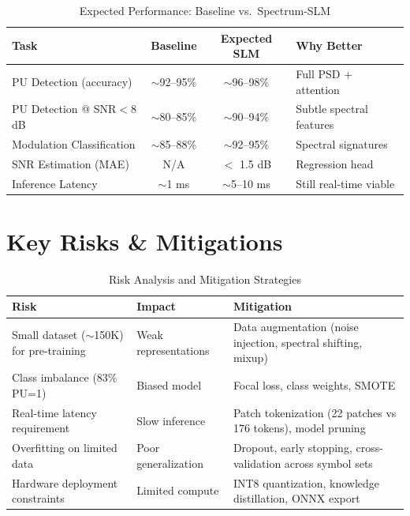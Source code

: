 \documentclass[12pt, a4paper]{article}
\begin{document}
\begin{table}[H]
\centering
\caption{Expected Performance: Baseline vs.\ Spectrum-SLM}
\label{tab:metrics}
\begin{tabular}{@{}lccl@{}}
\toprule
\textbf{Task}                    & \textbf{Baseline}       & \textbf{Expected SLM}    & \textbf{Why Better} \\
\midrule
PU Detection (accuracy)          & $\sim$92--95\%          & $\sim$96--98\%           & Full PSD + attention \\
PU Detection @ SNR$<$8 dB        & $\sim$80--85\%          & $\sim$90--94\%           & Subtle spectral features \\
Modulation Classification        & $\sim$85--88\%          & $\sim$92--95\%           & Spectral signatures \\
SNR Estimation (MAE)             & N/A                     & $<$ 1.5 dB              & Regression head \\
Inference Latency                & $\sim$1 ms              & $\sim$5--10 ms           & Still real-time viable \\
\bottomrule
\end{tabular}
\end{table}


\section{Key Risks \& Mitigations}

\begin{table}[H]
\centering
\caption{Risk Analysis and Mitigation Strategies}
\label{tab:risks}
\begin{tabular}{@{}p{3.5cm}p{2.5cm}p{7cm}@{}}
\toprule
\textbf{Risk}                              & \textbf{Impact} & \textbf{Mitigation} \\
\midrule
Small dataset ($\sim$150K) for pre-training & Weak representations & Data augmentation (noise injection, spectral shifting, mixup) \\
Class imbalance (83\% PU=1)                 & Biased model & Focal loss, class weights, SMOTE \\
Real-time latency requirement               & Slow inference & Patch tokenization (22 patches vs 176 tokens), model pruning \\
Overfitting on limited data                 & Poor generalization & Dropout, early stopping, cross-validation across symbol sets \\
Hardware deployment constraints             & Limited compute & INT8 quantization, knowledge distillation, ONNX export \\
\bottomrule
\end{tabular}
\end{table}
\end{document}
